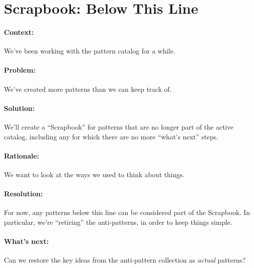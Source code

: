 \section{Scrapbook: Below This Line}

\paragraph{Context:} We've been working with the pattern catalog for a while.
\paragraph{Problem:} We've created more patterns than we can keep track of.
\paragraph{Solution:} We'll create a ``Scrapbook'' for patterns that are no longer part of the active catalog, including any for which there are no more ``what's next'' steps.
\paragraph{Rationale:} We want to look at the ways we used to think about things.
\paragraph{Resolution:} For now, any patterns below this line can be considered part of the Scrapbook.  In particular, we're ``retiring'' the anti-patterns, in order to keep things simple.
\paragraph{What's next:} Can we restore the key ideas from the anti-pattern collection as \emph{actual} patterns?
